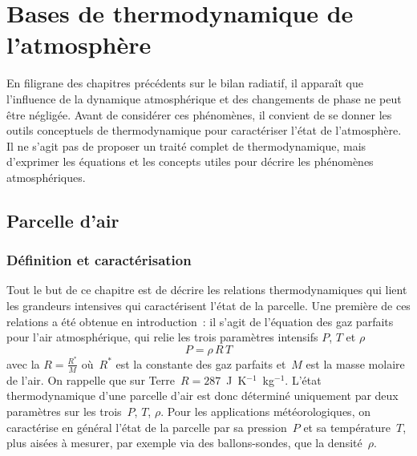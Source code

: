 \chapter{Bases de thermodynamique de l'atmosphère}


\bk
En filigrane des chapitres précédents sur le bilan radiatif, il apparaît que l'influence de la dynamique atmosphérique et des changements de phase ne peut être négligée. Avant de considérer ces phénomènes, il convient de se donner les outils conceptuels de thermodynamique pour caractériser l'état de l'atmosphère. Il ne s'agit pas de proposer un traité complet de thermodynamique, mais d'exprimer les équations et les concepts utiles pour décrire les phénomènes atmosphériques. 


\mk
\section{Parcelle d'air}

\sk
\subsection{Définition et caractérisation}

	

\sk
Tout le but de ce chapitre est de décrire les relations thermodynamiques qui lient les grandeurs intensives qui caractérisent l'état de la parcelle. Une première de ces relations a été obtenue en introduction~: il s'agit de l'équation des gaz parfaits pour l'air atmosphérique, qui relie les trois paramètres intensifs $P$, $T$ et $\rho$ 
\[ \boxed{ P = \rho \, R \,T } \] 
avec la  $R=\frac{R^*}{M}$ où~$R^*$ est la constante des gaz parfaits et~$M$ est la masse molaire de l'air. On rappelle que sur Terre~$R = 287$~J~K$^{-1}$~kg$^{-1}$. L'état thermodynamique d'une parcelle d'air est donc déterminé uniquement par deux paramètres sur les trois~$P$, $T$, $\rho$. Pour les applications météorologiques, on caractérise en général l'état de la parcelle par sa pression~$P$ et sa température~$T$, plus aisées à mesurer, par exemple via des ballons-sondes, que la densité~$\rho$.

